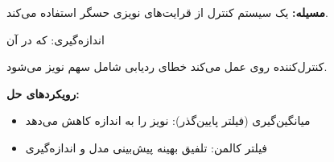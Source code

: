 

\textbf{مسیله:} یک سیستم کنترل از قرایت‌های نویزی حسگر استفاده می‌کند.

اندازه‌گیری:  که در آن 

کنترل‌کننده روی  عمل می‌کند \lr{\mbox{\ensuremath{\to}}} خطای ردیابی شامل سهم نویز می‌شود.

\textbf{رویکردهای حل:}

\begin{itemize}
\tightlist
\item
  میانگین‌گیری (فیلتر پایین‌گذر): نویز را به اندازه  کاهش می‌دهد
\item
  فیلتر کالمن: تلفیق بهینه پیش‌بینی مدل و اندازه‌گیری
\end{itemize}


